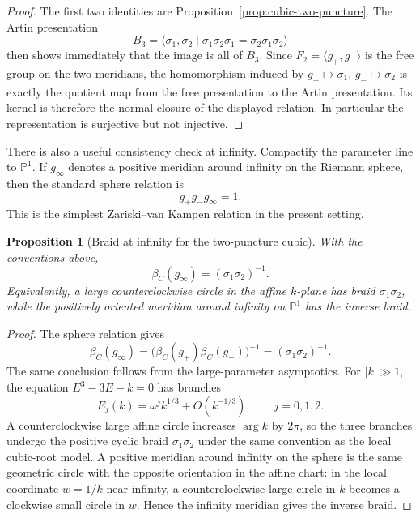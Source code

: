 \documentclass[11pt]{article}
\newtheorem{proposition}[theorem]{Proposition}
\numberwithin{equation}{section}
\newcommand{\bbP}{\mathbb P}
\begin{document}
\begin{proof}
The first two identities are Proposition~\ref{prop:cubic-two-puncture}.
The Artin presentation
\[
  B_3=\langle \sigma_1,\sigma_2\mid
  \sigma_1\sigma_2\sigma_1=\sigma_2\sigma_1\sigma_2\rangle
\]
then shows immediately that the image is all of \(B_3\).  Since
\(F_2=\langle g_+,g_-\rangle\) is the free group on the two meridians, the
homomorphism induced by \(g_+\mapsto\sigma_1\), \(g_-\mapsto\sigma_2\) is
exactly the quotient map from the free presentation to the Artin
presentation.  Its kernel is therefore the normal closure of the displayed
relation.  In particular the representation is surjective but not injective.
\end{proof}

There is also a useful consistency check at infinity.  Compactify the
parameter line to \(\bbP^1\).  If \(g_\infty\) denotes a positive meridian
around infinity on the Riemann sphere, then the standard sphere relation is
\[
  g_+g_-g_\infty=1.
\]
This is the simplest Zariski--van Kampen relation in the present setting.

\begin{proposition}[Braid at infinity for the two-puncture cubic]\label{prop:cubic-infinity}
With the conventions above,
\[
  \beta_C(g_\infty)=(\sigma_1\sigma_2)^{-1}.
\]
Equivalently, a large counterclockwise circle in the affine \(k\)-plane has
braid \(\sigma_1\sigma_2\), while the positively oriented meridian around
infinity on \(\bbP^1\) has the inverse braid.
\end{proposition}

\begin{proof}
The sphere relation gives
\[
  \beta_C(g_\infty)
  =\bigl(\beta_C(g_+)\beta_C(g_-)\bigr)^{-1}
  =(\sigma_1\sigma_2)^{-1}.
\]
The same conclusion follows from the large-parameter asymptotics.  For
\(|k|\gg1\), the equation \(E^3-3E-k=0\) has branches
\[
  E_j(k)=\omega^j k^{1/3}+O(k^{-1/3}),\qquad j=0,1,2.
\]
A counterclockwise large affine circle increases \(\arg k\) by \(2\pi\), so
the three branches undergo the positive cyclic braid \(\sigma_1\sigma_2\)
under the same convention as the local cubic-root model.  A positive
meridian around infinity on the sphere is the same geometric circle with the
opposite orientation in the affine chart: in the local coordinate
\(w=1/k\) near infinity, a counterclockwise large circle in \(k\) becomes a
clockwise small circle in \(w\).  Hence the infinity meridian gives the
inverse braid.
\end{proof}
\end{document}

